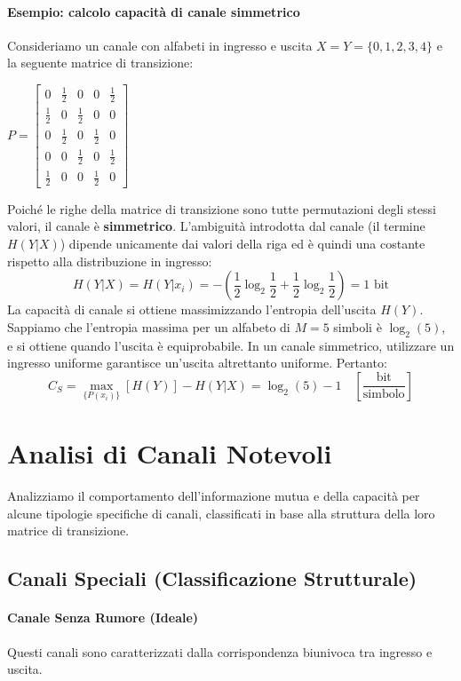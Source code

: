 \paragraph{Esempio: calcolo capacità di canale simmetrico}
Consideriamo un canale con alfabeti in ingresso e uscita $X=Y=\{0,1,2,3,4\}$ e la seguente matrice di transizione:
\begin{center}
    \renewcommand{\arraystretch}{1.8} %
    $P = \begin{bmatrix}
        0 & \frac{1}{2} & 0 & 0 & \frac{1}{2} \\
        \frac{1}{2} & 0 & \frac{1}{2} & 0 & 0 \\
        0 & \frac{1}{2} & 0 & \frac{1}{2} & 0 \\
        0 & 0 & \frac{1}{2} & 0 & \frac{1}{2} \\
        \frac{1}{2} & 0 & 0 & \frac{1}{2} & 0
    \end{bmatrix}$
\end{center}
Poiché le righe della matrice di transizione sono tutte permutazioni degli stessi valori, il canale è \textbf{simmetrico}. L'ambiguità introdotta dal canale (il termine $H(Y|X)$) dipende unicamente dai valori della riga ed è quindi una costante rispetto alla distribuzione in ingresso:
\[ H(Y|X) = H(Y|x_i) = -\left(\frac{1}{2}\log_2\frac{1}{2} + \frac{1}{2}\log_2\frac{1}{2}\right) = 1 \text{ bit} \]
La capacità di canale si ottiene massimizzando l'entropia dell'uscita $H(Y)$. Sappiamo che l'entropia massima per un alfabeto di $M=5$ simboli è $\log_2(5)$, e si ottiene quando l'uscita è equiprobabile. In un canale simmetrico, utilizzare un ingresso uniforme garantisce un'uscita altrettanto uniforme. Pertanto:
\[ C_S = \max_{\{P(x_i)\}}[H(Y)] - H(Y|X) = \log_2(5) - 1 \quad \left[\frac{\text{bit}}{\text{simbolo}}\right] \]
\section{Analisi di Canali Notevoli}
Analizziamo il comportamento dell'informazione mutua e della capacità per alcune tipologie specifiche di canali, classificati in base alla struttura della loro matrice di transizione.

\subsection{Canali Speciali (Classificazione Strutturale)}


\paragraph{Canale Senza Rumore (Ideale)}
Questi canali sono caratterizzati dalla corrispondenza biunivoca tra ingresso e uscita.
%

